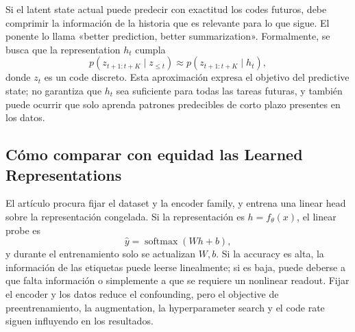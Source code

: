Si el latent state actual puede predecir con exactitud los codes futuros, debe comprimir la información de la historia que es relevante para lo que sigue. El ponente lo llama «better prediction, better summarization». Formalmente, se busca que la representation $h_t$ cumpla
\[
p(z_{t+1:t+K}\mid z_{\le t})
\approx p(z_{t+1:t+K}\mid h_t),
\]
donde $z_t$ es un code discreto. Esta aproximación expresa el objetivo del predictive state; no garantiza que $h_t$ sea suficiente para todas las tareas futuras, y también puede ocurrir que solo aprenda patrones predecibles de corto plazo presentes en los datos.



\subsection{Cómo comparar con equidad las Learned Representations}

El artículo procura fijar el dataset y la encoder family, y entrena una linear head sobre la representación congelada. Si la representación es $h=f_\theta(x)$, el linear probe es
\[
\hat{y}=\operatorname{softmax}(Wh+b),
\]
y durante el entrenamiento solo se actualizan $W,b$. Si la accuracy es alta, la información de las etiquetas puede leerse linealmente; si es baja, puede deberse a que falta información o simplemente a que se requiere un nonlinear readout. Fijar el encoder y los datos reduce el confounding, pero el objective de preentrenamiento, la augmentation, la hyperparameter search y el code rate siguen influyendo en los resultados.



